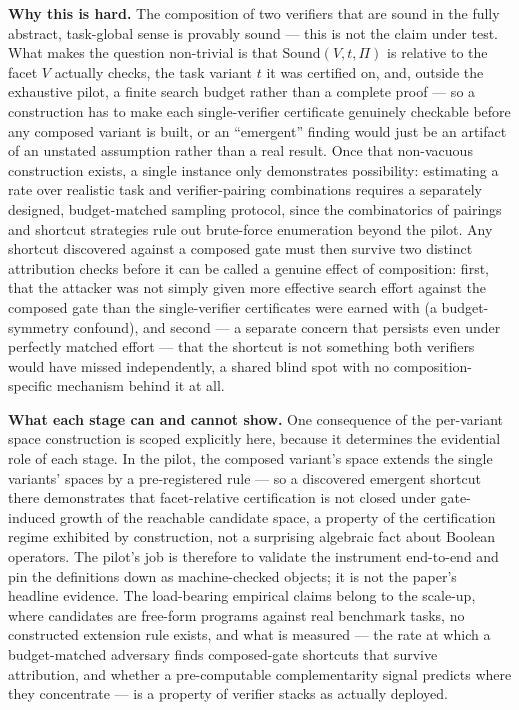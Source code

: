 \documentclass[11pt]{article}
\begin{document}
\noindent\textbf{Why this is hard.} The composition of two verifiers that are sound in the fully abstract, task-global sense is provably sound --- this is not the claim under test. What makes the question non-trivial is that $\mathrm{Sound}(V, t, \Pi)$ is relative to the facet $V$ actually checks, the task variant $t$ it was certified on, and, outside the exhaustive pilot, a finite search budget rather than a complete proof --- so a construction has to make each single-verifier certificate genuinely checkable before any composed variant is built, or an ``emergent'' finding would just be an artifact of an unstated assumption rather than a real result. Once that non-vacuous construction exists, a single instance only demonstrates possibility: estimating a rate over realistic task and verifier-pairing combinations requires a separately designed, budget-matched sampling protocol, since the combinatorics of pairings and shortcut strategies rule out brute-force enumeration beyond the pilot. Any shortcut discovered against a composed gate must then survive two distinct attribution checks before it can be called a genuine effect of composition: first, that the attacker was not simply given more effective search effort against the composed gate than the single-verifier certificates were earned with (a budget-symmetry confound), and second --- a separate concern that persists even under perfectly matched effort --- that the shortcut is not something both verifiers would have missed independently, a shared blind spot with no composition-specific mechanism behind it at all.

\medskip
\noindent\textbf{What each stage can and cannot show.} One consequence of the per-variant space construction is scoped explicitly here, because it determines the evidential role of each stage. In the pilot, the composed variant's space extends the single variants' spaces by a pre-registered rule --- so a discovered emergent shortcut there demonstrates that facet-relative certification is not closed under gate-induced growth of the reachable candidate space, a property of the certification regime exhibited by construction, not a surprising algebraic fact about Boolean operators. The pilot's job is therefore to validate the instrument end-to-end and pin the definitions down as machine-checked objects; it is not the paper's headline evidence. The load-bearing empirical claims belong to the scale-up, where candidates are free-form programs against real benchmark tasks, no constructed extension rule exists, and what is measured --- the rate at which a budget-matched adversary finds composed-gate shortcuts that survive attribution, and whether a pre-computable complementarity signal predicts where they concentrate --- is a property of verifier stacks as actually deployed.
\end{document}

